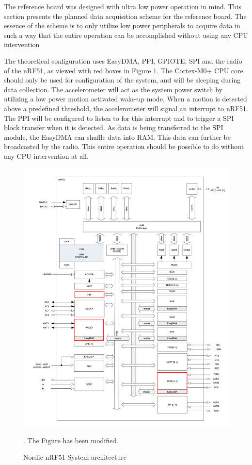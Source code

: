 The reference board was designed with ultra low power operation in mind. This section presents the planned data acquisition scheme for the reference board. The essence of the scheme is to only utilize low power peripherals to acquire data in such a way that the entire operation can be accomplished without using any CPU intervention  

The theoretical configuration uses EasyDMA, PPI, GPIOTE, SPI and the radio of the nRF51, as viewed with red boxes in Figure \ref{fig:accel_working_principle}. The Cortex-M0+ CPU core should only be used for configuration of the system, and will be sleeping during data collection. The accelerometer will act as the system power switch by utilizing a low power motion activated wake-up mode. When a motion is detected above a predefined threshold, the accelerometer will signal an interrupt to nRF51. The PPI will be configured to listen to for this interrupt and to trigger a SPI block transfer when it is detected. As data is being transferred to the SPI module, the EasyDMA can shuffle data into RAM. This data can further be broadcasted by the radio. This entire operation should be possible to do without any CPU intervention at all.

\begin{figure}[h]
\centering
\includegraphics[scale=0.5]{fig/nrf51822_edit.png}
\caption{Nordic nRF51 System architecture \cite{nRF51}}. The Figure has been modified.
\label{fig:accel_working_principle}
\end{figure}